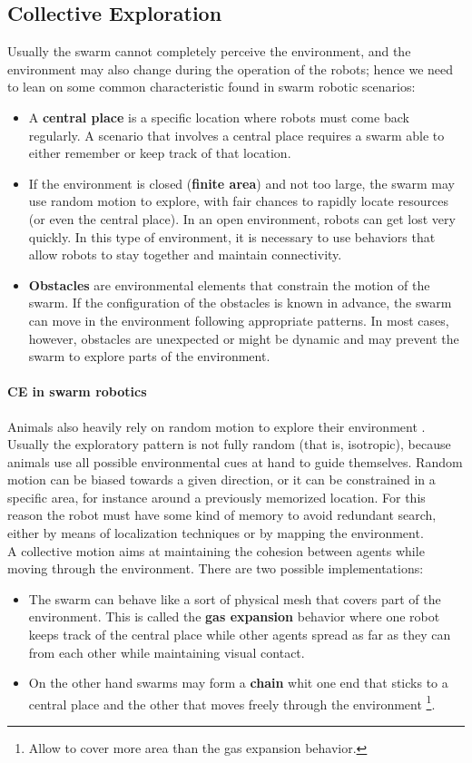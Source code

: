 \documentclass[10pt,a4paper]{article}
\begin{document}
\subsection{Collective Exploration}
Usually the swarm cannot completely perceive the environment, and the environment may also change during the operation of the robots; hence we need to lean on some common characteristic found in swarm robotic scenarios:
\begin{itemize}
\item A \textbf{central place} is a specific location where robots must come back regularly. A scenario that involves a central place requires a swarm able to either remember or keep track of that location.

\item If the environment is closed (\textbf{finite area}) and not too large, the swarm may use random motion to explore, with fair chances to rapidly locate resources (or even the central place). In an open environment, robots can get lost very quickly. In this type of environment, it is necessary to use behaviors that allow robots to stay together and maintain connectivity.

\item \textbf{Obstacles} are environmental elements that constrain the motion of the swarm. If the configuration of the obstacles is known in advance, the swarm can move in the environment following appropriate patterns. In most cases, however, obstacles are unexpected or might be dynamic and may prevent the swarm to explore parts of the environment.
\end{itemize}

\paragraph{CE in swarm robotics}
Animals also heavily rely on random motion to explore their environment . Usually the exploratory pattern is not fully random (that is, isotropic), because animals use all possible environmental cues at hand to guide themselves. Random motion can be biased towards a given direction, or it can be constrained in a specific area, for instance around a previously memorized location. For this reason the robot must have some kind of memory to avoid redundant search, either by means of localization techniques or by mapping the environment.\\
A collective motion aims at maintaining the cohesion between agents while moving through the environment. There are two possible implementations:
\begin{itemize}
\item The swarm can behave like a sort of physical mesh that covers part of the environment. This is called the \textbf{gas expansion} behavior where one robot keeps track of the central place while other agents spread as far as they can from each other while maintaining visual contact.
\item On the other hand swarms may form a \textbf{chain} whit one end that sticks to a central place and the other that moves freely through the environment \footnote{Allow to cover more area than the gas expansion behavior.}.
\end{itemize}
\end{document}
